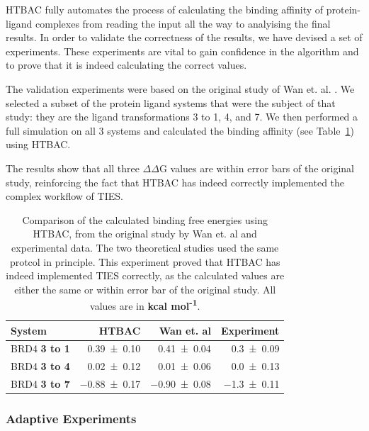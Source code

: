 HTBAC fully automates the process of calculating the binding affinity of
protein-ligand complexes from reading the input all the way to analyising the
final results. In order to validate the correctness of the results, we have
devised a set of experiments. These experiments are vital to gain confidence
in the algorithm and to prove that it is indeed calculating the correct values.

The validation experiments were based on the original study of Wan et. al.
\cite{Wan2017brd4}. We selected a subset of the protein ligand systems that
were the subject of that study: they are the ligand transformations 3 to 1, 4,
and 7. We then performed a full simulation on all 3 systems and calculated the
binding affinity (see Table~\ref{tab:exp2}) using HTBAC.

The results show that all three $\Delta \Delta$G values are within error bars
of the original study, reinforcing the fact that HTBAC has indeed correctly
implemented the complex workflow of TIES.

\begin{table}
  \centering
  \begin{tabular}{l@{\hskip 1in}r@{\hskip 0.2in}r@{\hskip 0.2in}r}
    \toprule
    System & HTBAC & Wan et. al & Experiment \\
    \midrule
    BRD4 \textbf{3 to 1} & \num{0.39 +- 0.10} &   \num{0.41 +- 0.04} &  \num{0.3 +- 0.09} \\
    BRD4 \textbf{3 to 4} & \num{0.02 +- 0.12} &   \num{0.01 +- 0.06} &  \num{0.0 +- 0.13} \\
    BRD4 \textbf{3 to 7} & \num{-0.88 +- 0.17} &  \num{-0.90 +- 0.08} & \num{-1.3 +- 0.11} \\
    \bottomrule
  \end{tabular}

  \caption{Comparison of the calculated binding free energies using HTBAC, from
  the original study by Wan et. al and experimental data. The two theoretical
  studies used the same protcol in principle. This experiment proved that HTBAC
  has indeed implemented TIES correctly, as the calculated values are either
  the same or within error bar of the original study. All values are in
  \textbf{kcal mol\textsuperscript{-1}}.}
  \label{tab:exp2}


\end{table}


\subsubsection{Adaptive Experiments}

